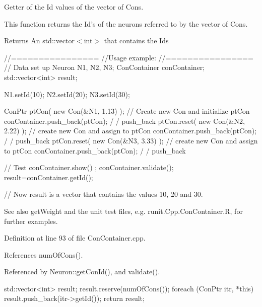 Getter of the Id values of the vector of Cons. 

This function returns the Id's of the neurons referred to by the vector of Cons. \begin{DoxyReturn}{Returns}
An std::vector$<$int$>$ that contains the Ids
\end{DoxyReturn}

\begin{DoxyCode}
  //================
  //Usage example:
  //================
        // Data set up
                        Neuron N1, N2, N3;
                        ConContainer conContainer;
                        std::vector<int> result;

                        N1.setId(10);
                        N2.setId(20);
                        N3.setId(30);

                        ConPtr ptCon( new Con(&N1, 1.13) );     // Create new Con
       and initialize ptCon
                        conContainer.push_back(ptCon);                          /
      / push_back
                        ptCon.reset(  new Con(&N2, 2.22) );             // create
       new Con and assign to ptCon
                        conContainer.push_back(ptCon);                          /
      / push_back
                        ptCon.reset(  new Con(&N3, 3.33) );             // create
       new Con and assign to ptCon
                        conContainer.push_back(ptCon);                          /
      / push_back

        // Test
                        conContainer.show() ;
                        conContainer.validate();
                        result=conContainer.getId();

        // Now result is a vector that contains the values 10, 20 and 30.
\end{DoxyCode}


\begin{DoxySeeAlso}{See also}
getWeight and the unit test files, e.g. runit.Cpp.ConContainer.R, for further examples. 
\end{DoxySeeAlso}


Definition at line 93 of file ConContainer.cpp.



References numOfCons().



Referenced by Neuron::getConId(), and validate().


\begin{DoxyCode}
{
  std::vector<int> result;
  result.reserve(numOfCons());
  foreach (ConPtr itr, *this)
    {
      result.push_back(itr->getId());
    }
  return result;
}
\end{DoxyCode}


